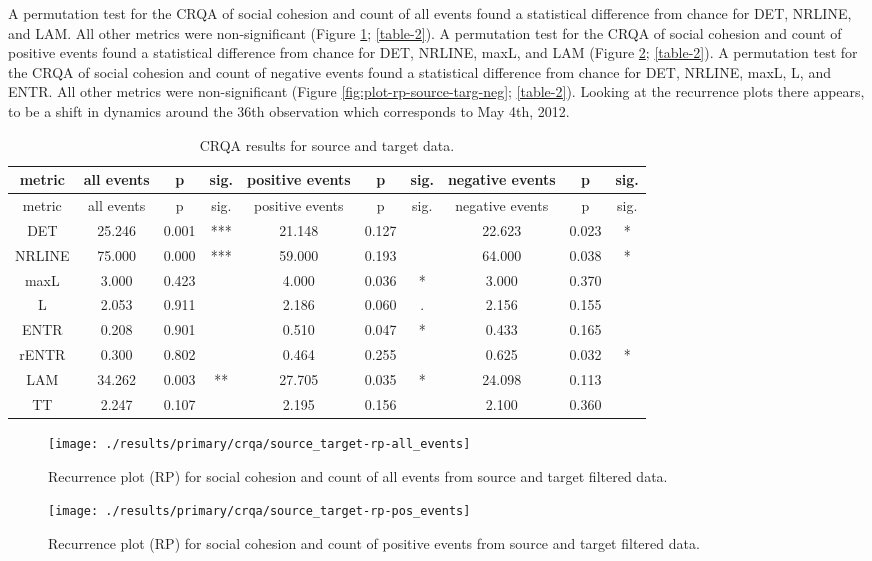 \documentclass[english,man]{apa6}
\begin{document}
A permutation test for the CRQA of social cohesion and count of all events found a statistical difference from chance for DET, NRLINE, and LAM. All other metrics were non-significant (Figure \ref{fig:plot-rp-source-targ-all}; \autoref{table-2}). A permutation test for the CRQA of social cohesion and count of positive events found a statistical difference from chance for DET, NRLINE, maxL, and LAM (Figure \ref{fig:plot-rp-source-targ-pos}; \autoref{table-2}). A permutation test for the CRQA of social cohesion and count of negative events found a statistical difference from chance for DET, NRLINE, maxL, L, and ENTR. All other metrics were non-significant (Figure \ref{fig:plot-rp-source-targ-neg}; \autoref{table-2}). Looking at the recurrence plots there appears, to be a shift in dynamics around the 36th observation which corresponds to May 4th, 2012.

\begin{longtable}[]{@{}cccccccccc@{}}
\caption{\label{table-2}CRQA results for source and target data.}\tabularnewline
\toprule
metric & all events & p & sig. & positive events & p & sig. & negative events & p & sig.\tabularnewline
\midrule
\endfirsthead
\toprule
metric & all events & p & sig. & positive events & p & sig. & negative events & p & sig.\tabularnewline
\midrule
\endhead
DET & 25.246 & 0.001 & *** & 21.148 & 0.127 & & 22.623 & 0.023 & *\tabularnewline
NRLINE & 75.000 & 0.000 & *** & 59.000 & 0.193 & & 64.000 & 0.038 & *\tabularnewline
maxL & 3.000 & 0.423 & & 4.000 & 0.036 & * & 3.000 & 0.370 &\tabularnewline
L & 2.053 & 0.911 & & 2.186 & 0.060 & . & 2.156 & 0.155 &\tabularnewline
ENTR & 0.208 & 0.901 & & 0.510 & 0.047 & * & 0.433 & 0.165 &\tabularnewline
rENTR & 0.300 & 0.802 & & 0.464 & 0.255 & & 0.625 & 0.032 & *\tabularnewline
LAM & 34.262 & 0.003 & ** & 27.705 & 0.035 & * & 24.098 & 0.113 &\tabularnewline
TT & 2.247 & 0.107 & & 2.195 & 0.156 & & 2.100 & 0.360 &\tabularnewline
\bottomrule
\end{longtable}

\begin{figure}
\texttt{[image: ./results/primary/crqa/source\_target-rp-all\_events]} \caption{Recurrence plot (RP) for social cohesion and count of all events from source and target filtered data.}\label{fig:plot-rp-source-targ-all}
\end{figure}

\begin{figure}
\texttt{[image: ./results/primary/crqa/source\_target-rp-pos\_events]} \caption{Recurrence plot (RP) for social cohesion and count of positive events from source and target filtered data.}\label{fig:plot-rp-source-targ-pos}
\end{figure}
\end{document}

